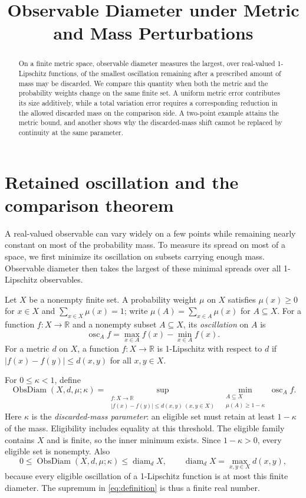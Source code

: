 \documentclass[a4paper,11pt]{article}
\title{Observable Diameter under Metric and Mass Perturbations}
\author{}
\date{}
\DeclareMathOperator{\ObsDiam}{ObsDiam}
\DeclareMathOperator{\osc}{osc}
\begin{document}
\maketitle

\begin{abstract}
On a finite metric space, observable diameter measures the largest,
over real-valued 1-Lipschitz functions, of the smallest oscillation
remaining after a prescribed amount of mass may be discarded. We
compare this quantity when both the metric and the probability weights
change on the same finite set. A uniform metric error contributes its
size additively, while a total variation error requires a corresponding
reduction in the allowed discarded mass on the comparison side. A
two-point example attains the metric bound, and another shows why the
discarded-mass shift cannot be replaced by continuity at the same
parameter.
\end{abstract}

\section{Retained oscillation and the comparison theorem}

A real-valued observable can vary widely on a few points while remaining
nearly constant on most of the probability mass. To measure its spread
on most of a space, we first minimize its oscillation on subsets carrying
enough mass. Observable diameter then takes the largest of these
minimal spreads over all 1-Lipschitz observables.

Let $X$ be a nonempty finite set. A probability weight $\mu$ on $X$
satisfies $\mu(x)\ge0$ for $x\in X$ and
$\sum_{x\in X}\mu(x)=1$; write
$\mu(A)=\sum_{x\in A}\mu(x)$ for $A\subseteq X$.
For a function $f:X\to\mathbb R$ and a nonempty subset $A\subseteq X$,
its \emph{oscillation} on $A$ is
\[
 \osc_A f=\max_{x\in A}f(x)-\min_{x\in A}f(x).
\]
For a metric $d$ on $X$, a function $f:X\to\mathbb R$ is
1-Lipschitz with respect to $d$ if
$|f(x)-f(y)|\le d(x,y)$ for all $x,y\in X$.

For $0\le\kappa<1$, define
\begin{equation}\label{eq:definition}
 \ObsDiam(X,d,\mu;\kappa)
 =\sup_{\substack{f:X\to\mathbb R\\
                  |f(x)-f(y)|\le d(x,y)\ (x,y\in X)}}
    \ \min_{\substack{A\subseteq X\\\mu(A)\ge1-\kappa}}
      \osc_A f.
\end{equation}
Here $\kappa$ is the \emph{discarded-mass parameter}: an eligible set
must retain at least $1-\kappa$ of the mass. Eligibility includes
equality at this threshold. The eligible family contains $X$ and is
finite, so the inner minimum exists. Since $1-\kappa>0$, every
eligible set is nonempty. Also
\[
 0\le\ObsDiam(X,d,\mu;\kappa)
 \le\operatorname{diam}_d X,
 \qquad
 \operatorname{diam}_d X=\max_{x,y\in X}d(x,y),
\]
because every eligible oscillation of a 1-Lipschitz function is at most
this finite diameter. The supremum in \eqref{eq:definition} is thus a
finite real number.
\end{document}

